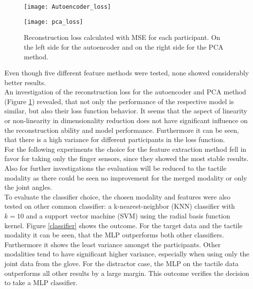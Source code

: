 \begin{figure}
	\centering
	\begin{minipage}{0.496\textwidth}
		\centering
		\texttt{[image: Autoencoder\_loss]}
	\end{minipage}
	\begin{minipage}{0.496\textwidth}
		\centering
		\texttt{[image: pca\_loss]}
	\end{minipage}
	\caption{Reconstruction loss calculated with MSE for each participant. On the left side for the autoencoder and on the right side for the PCA method.}
	\label{ae_pca_loss}
\end{figure}
Even though five different feature methods were tested, none showed considerably better results.\\
An investigation of the reconstruction loss for the autoencoder and PCA method (Figure \ref{ae_pca_loss}) revealed, that not only the performance of the respective model is similar, but also their loss function behavior. It seems that the aspect of linearity or non-linearity in dimensionality reduction does not have significant influence on the reconstruction ability and model performance. Furthermore it can be seen, that there is a high variance for different participants in the loss function.\\
For the following experiments the choice for the feature extraction method fell in favor for taking only the finger sensors, since they showed the most stable results. Also for further investigations the evaluation will be reduced to the tactile modality as there could be seen no improvement for the merged modality or only the joint angles.\\
To evaluate the classifier choice, the chosen modality and features were also tested on other common classifier: a k-nearest-neighbor (KNN) classifier with $ k=10 $ and a support vector machine (SVM) using the radial basis function kernel. Figure \ref{classifier} shows the outcome. For the target data and the tactile modality it can be seen, that the MLP outperforms both other classifiers. Furthermore it shows the least variance amongst the participants. Other modalities tend to have significant higher variance, especially when using only the joint data from the glove. For the distractor case, the MLP on the tactile data outperforms all other results by a large margin. This outcome verifies the decision to take a MLP classifier. 

